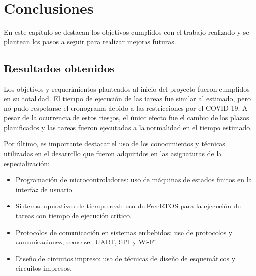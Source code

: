 
\chapter{Conclusiones} %

\label{Chapter5} %



En este capítulo se destacan los objetivos cumplidos con el trabajo realizado y se plantean los pasos a seguir para realizar mejoras futuras.


\section{Resultados obtenidos }

Los objetivos y requerimientos planteados al inicio del proyecto fueron cumplidos en su totalidad. El tiempo de ejecución de las tareas fue similar al estimado, pero no pudo respetarse el cronograma debido a las restricciones por el COVID 19. A pesar de la ocurrencia de estos riesgos, el único efecto fue el cambio de los plazos planificados y las tareas fueron ejecutadas a la normalidad en el tiempo estimado.

Por último, es importante destacar el uso de los conocimientos y técnicas utilizadas en el desarrollo que fueron adquiridos en las asignaturas de la especialización:
\begin{itemize}
 \item Programación de microcontroladores: uso de máquinas de estados finitos en la interfaz de usuario.
 \item Sistemas operativos de tiempo real: uso de FreeRTOS para la ejecución de tareas con tiempo de ejecución crítico.
 \item Protocolos de comunicación en sistemas embebidos: uso de protocolos y comunicaciones, como ser UART, SPI y Wi-Fi.
 \item Diseño de circuitos impreso: uso de técnicas de diseño de esquemáticos y circuitos impresos.
\end{itemize}


